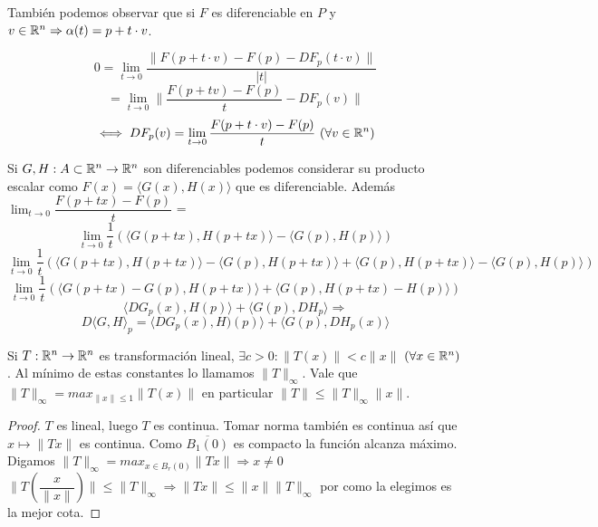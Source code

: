 También podemos observar que si $F$ es diferenciable en $P$ y $v \in \mathbb{R}^n \Rightarrow \alpha(t) = p + t \cdot v$.

\begin{equation}
  0 = \lim_{t \to 0} \dfrac{\| F(p + t \cdot v) - F(p) - DF_p(t \cdot v) \|}{|t|}
\end{equation}
\begin{equation}
  = \lim_{t \to 0} \| \dfrac{F(p + tv) - F(p)}{t} - DF_p(v) \|
\end{equation}
\begin{equation}
  \iff DF_p(v) = \lim_{t \to 0} \dfrac{F(p+t \cdot v) - F(p)}{t} \text{  } (\forall v \in \mathbb{R}^n)
\end{equation}

\begin{note}
  Si $G, H: A \subset \mathbb{R}^n \to \mathbb{R}^n$ son diferenciables podemos considerar su producto escalar como $F(x) = \langle G(x), H(x) \rangle$ que es diferenciable.
  Además $\lim_{t \to 0} \dfrac{F(p + tx) - F(p)}{t}$ = \begin{equation}
    \lim_{t \to 0} \dfrac{1}{t} ( \langle G(p + tx), H(p+tx) \rangle - \langle G(p), H(p) \rangle )
  \end{equation}
  \begin{equation}
    \lim_{t \to 0} \dfrac{1}{t} ( \langle G(p+tx), H(p+tx) \rangle - \langle G(p), H(p+tx) \rangle + \langle G(p), H(p+tx) \rangle - \langle G(p), H(p) \rangle)
  \end{equation}
  \begin{equation}
    \lim_{t \to 0} \dfrac{1}{t} (\langle G(p+tx) - G(p), H(p + tx) \rangle + \langle G(p), H(p+tx) - H(p) \rangle)
  \end{equation}
  \begin{equation}
    \langle DG_p(x), H(p) \rangle + \langle G(p), DH_p \rangle \Rightarrow
  \end{equation}
  \begin{equation}
    D\langle G, H \rangle_p = \langle DG_p(x), H)(p) \rangle + \langle G(p), DH_p(x) \rangle
  \end{equation}
\end{note}

\begin{lemma}
  Si $T: \mathbb{R}^n \to \mathbb{R}^n$ es transformación lineal, $\exists c > 0: \|T(x)\| < c \|x\|$ $(\forall x \in \mathbb{R}^n)$. Al mínimo de estas constantes lo llamamos $\|T\|_{\infty}$. Vale que $\|T\|_{\infty} = max_{\|x\| \leq 1} \|T(x)\|$ en particular
  $\|T\| \leq \|T\|_{\infty} \|x\|$.
  \begin{proof}
    $T$ es lineal, luego $T$ es continua. Tomar norma también es continua así que $x \mapsto \|Tx\|$ es continua. Como $\overline{B_1(0)}$ es compacto la función alcanza máximo. Digamos $\|T\|_{\infty} = max_{x \in B_r(0)} \|Tx\| \Rightarrow x \neq 0$ \\
    $\|T(\dfrac{x}{\|x\|})\| \leq \|T\|_{\infty} \Rightarrow \|Tx\| \leq \|x\| \|T\|_{\infty}$ por como la elegimos es la mejor cota.
  \end{proof}
\end{lemma}

